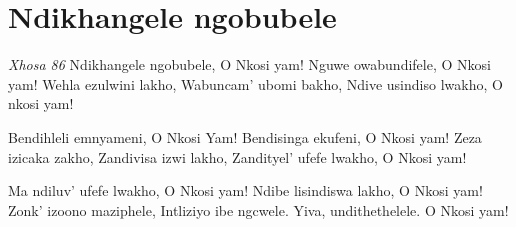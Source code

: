 \starttocol
\chapter{Ndikhangele ngobubele}
\nexttocol
\hfill{\it Xhosa 86}
\stoptocol
\starttocol
\startlines
{\sc Ndikhangele} ngobubele,
O Nkosi yam!
Nguwe owabundifele,
O Nkosi yam!
Wehla ezulwini lakho,
Wabuncam' ubomi bakho,
Ndive usindiso lwakho,
O nkosi yam!

Bendihleli emnyameni,
O Nkosi Yam!
Bendisinga ekufeni,
O Nkosi yam!
Zeza izicaka zakho,
Zandivisa izwi lakho,
Zandityel' ufefe lwakho,
O Nkosi yam!

Ma ndiluv' ufefe lwakho,
O Nkosi yam!
Ndibe lisindiswa lakho,
O Nkosi yam!
Zonk' izoono maziphele,
Intliziyo ibe ngcwele.
Yiva, undithethelele.
O Nkosi yam!
\stoplines
\nexttocol

\stoptocol
